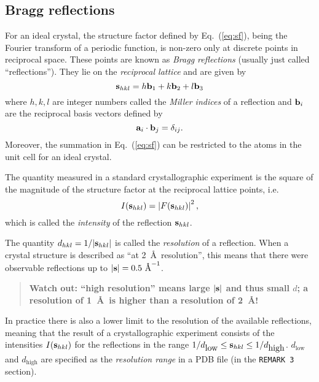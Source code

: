 \documentclass[12pt]{article}
\newcommand{\vect}[1]{{\bf #1}}
\newcommand{\va}{\vect{a}}
\newcommand{\vb}{\vect{b}}
\newcommand{\vs}{\vect{s}}
\begin{document}
\begin{sloppy}
\subsection{Bragg reflections}

For an ideal crystal, the structure factor defined by
Eq.~(\ref{eq:sf}), being the Fourier transform of a periodic function,
is non-zero only at discrete points in reciprocal space. These points
are known as \textit{Bragg reflections} (usually just called
``reflections''). They lie on the \textit{reciprocal lattice} and are
given by
\begin{equation}
\vs_{hkl} = h \vb_1 + k \vb_2 + l \vb_3
\end{equation}
where $h, k, l$ are integer numbers called the \textit{Miller indices}
of a reflection and $\vb_i$ are the reciprocal basis vectors defined by
\begin{equation}
\va_i \cdot \vb_j = \delta_{ij}.
\end{equation}
Moreover, the summation in Eq.~(\ref{eq:sf}) can be restricted to the
atoms in the unit cell for an ideal crystal.

The quantity measured in a standard crystallographic experiment is the
square of the magnitude of the structure factor at the reciprocal
lattice points, i.e.
\begin{equation}
I(\vs_{hkl}) = \left| F(\vs_{hkl}) \right|^2,
\end{equation}
which is called the \textit{intensity} of the reflection $\vs_{hkl}$.

The quantity $d_{hkl}=1/|\vs_{hkl}|$ is called the \textit{resolution}
of a reflection. When a crystal structure is described as ``at 2~\AA\ 
resolution'', this means that there were observable reflections up to
$|\vs|=0.5 \mbox{ \AA}^{-1}$.
\begin{quote}
\textbf{Watch out: ``high resolution'' means large $|\vs|$ and thus small $d$;
a resolution of 1~\AA\ is higher than a resolution of 2~\AA!}
\end{quote}

In practice there is also a lower limit to the resolution of the
available reflections, meaning that the result of a crystallographic
experiment consists of the intensities $I(\vs_{hkl})$ for the
reflections in the range $1/d_{\mbox{low}} \leq \vs_{hkl} \leq
1/d_{\mbox{high}}$. $d_{\mbox{low}}$ and $d_{\mbox{high}}$ are
specified as the \textit{resolution range} in a PDB file (in the
\texttt{REMARK   3} section).


\end{sloppy}
\end{document}
